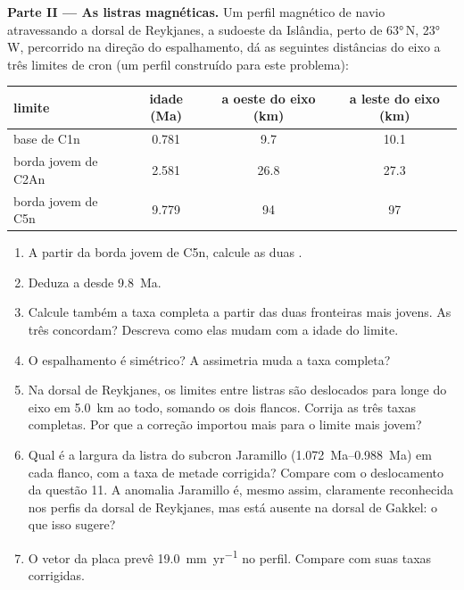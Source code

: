 \begin{problem}
\noindent\textbf{Parte II --- As listras magnéticas.}
Um perfil magnético de navio atravessando a dorsal de Reykjanes, a sudoeste da Islândia, perto de
\ang{63}\,N, \ang{23}\,W, percorrido na direção do espalhamento, dá as seguintes
distâncias do eixo a três limites de cron (um perfil construído para
este problema):
\begin{center}\small
\begin{tabular}{lccc}
\hline
limite & idade (Ma) & a oeste do eixo (km) & a leste do eixo (km)\\
\hline
base de C1n & 0.781 & 9.7 & 10.1\\
borda jovem de C2An & 2.581 & 26.8 & 27.3\\
borda jovem de C5n & 9.779 & 94 & 97\\
\hline
\end{tabular}
\end{center}
\begin{enumerate}[resume]
  \item A partir da borda jovem de C5n, calcule as duas .
  \item Deduza a  desde \qty{9.8}{Ma}.
  \item Calcule também a taxa completa a partir das duas fronteiras mais jovens. As
        três concordam? Descreva como elas mudam com a idade do limite.
  \item O espalhamento é simétrico? A assimetria muda a taxa completa?
  \item Na dorsal de Reykjanes, os limites entre listras são deslocados para longe do eixo em \qty{5.0}{km} ao todo, somando os dois flancos.
        Corrija as três taxas completas. Por que a correção importou mais para o limite mais jovem?
  \item Qual é a largura da listra do subcron Jaramillo
        (\qtyrange{1.072}{0.988}{Ma}) em cada flanco, com a taxa de metade corrigida? Compare com o deslocamento da questão 11. A anomalia Jaramillo é, mesmo assim, claramente reconhecida nos perfis da dorsal de Reykjanes, mas está ausente na dorsal de Gakkel: o que isso sugere?
  \item O vetor da placa prevê \qty{19.0}{mm.yr^{-1}} no perfil. Compare
        com suas taxas corrigidas.
\end{enumerate}


\end{problem}
